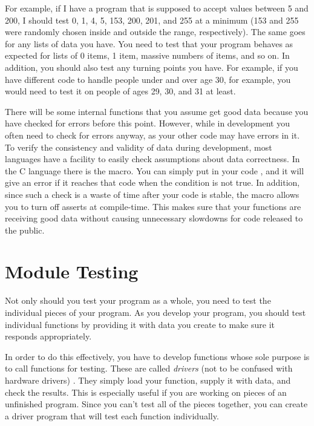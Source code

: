 For example, if I have a program that is supposed to accept values between 5
and 200, I should test 0, 1, 4, 5, 153, 200, 201, and 255 at a minimum (153 
and 255 were randomly chosen inside and outside the range, respectively).  The
same goes for any lists of data you have.  You need to test that your program
behaves as expected for lists of 0 items, 1 item, massive numbers of items, and 
so on.  In addition, 
you should also test any turning points you have.  For example, if you have
different code to handle people under and over age 30, for example, you would
need to test it on people of ages 29, 30, and 31 at least.

There will be some internal functions that you assume get good data because
you have checked for errors before this point.  However, while in development
you often need to check for errors anyway, as your other code may have
errors in it.  To verify the consistency and validity of data during
development, most languages have a facility to easily check assumptions 
about data correctness.  In the C language there is the 
macro.  You can simply put in your code
, and it will give an error if it 
reaches that code when the condition is not true.  In addition, since such
a check is a waste of time after your code is stable, the 
 macro allows you to turn off asserts at 
compile-time.   This makes sure that your functions are receiving good
data without causing unnecessary slowdowns for code released to the public.

\section{Module Testing}

Not only should you test your program as a whole, you need to test the 
individual pieces of your program.  As you
develop your program, you should test individual functions by providing it with
data you create to make sure it responds appropriately.

In order to do this effectively, you have to develop functions whose
sole purpose is to call functions for testing.  These are called 
\emph{drivers} 
(not to be confused with hardware drivers) .
They simply load your function, supply it with data, and check the results.
This is especially useful if you are working on pieces of an unfinished 
program.  Since you can't test all of the pieces together, you can create
a driver program that will test each function individually.  

